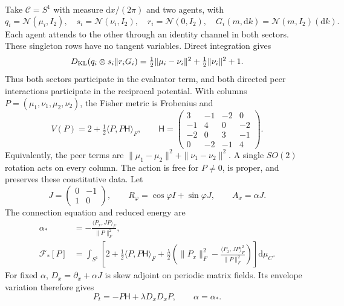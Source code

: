 Take $\mathcal C=S^1$ with measure $\mathrm d x/(2\pi)$ and two agents, with
\begin{equation}
 q_i=\mathcal N(\mu_i,I_2),\quad s_i=\mathcal N(\nu_i,I_2),\quad
 r_i=\mathcal N(0,I_2),\quad G_i(m,\mathrm d k)=\mathcal N(m,I_2)(\mathrm d k).
\end{equation}
Each agent attends to the other through an identity channel in both sectors. These singleton rows have no tangent variables. Direct integration gives
\begin{equation}
 D_{\mathrm{KL}}(q_i\otimes s_i\Vert r_iG_i)
 =\tfrac12\|\mu_i-\nu_i\|^2+\tfrac12\|\nu_i\|^2+1.
\end{equation}
Thus both sectors participate in the evaluator term, and both directed peer interactions participate in the reciprocal potential. With columns $P=(\mu_1,\nu_1,\mu_2,\nu_2)$, the Fisher metric is Frobenius and
\begin{equation}
 V(P)=2+\tfrac12\langle P,P\mathsf H\rangle_F,\qquad
 \mathsf H=\begin{pmatrix}
 3&-1&-2&0\\-1&4&0&-2\\-2&0&3&-1\\0&-2&-1&4
 \end{pmatrix}.
 \label{ctx:c:eq:witnessV}
\end{equation}
Equivalently, the peer terms are $\|\mu_1-\mu_2\|^2+\|\nu_1-\nu_2\|^2$. A single $SO(2)$ rotation acts on every column. The action is free for $P\ne0$, is proper, and preserves these constitutive data. Let
\begin{equation}
 J=\begin{pmatrix}0&-1\\1&0\end{pmatrix},\qquad
 R_\varphi=\cos\varphi I+\sin\varphi J,\qquad
 A_x=\alpha J.
\end{equation}
The connection equation and reduced energy are
\begin{align}
 \alpha_*&=-\frac{\langle P_x,JP\rangle_F}{\|P\|_F^2},\label{ctx:c:eq:alpha}\\
 \mathcal F_*[P]&=\int_{S^1}\left[
 2+\tfrac12\langle P,P\mathsf H\rangle_F+
 \frac\lambda2\left(\|P_x\|_F^2-
       \frac{\langle P_x,JP\rangle_F^2}{\|P\|_F^2}\right)\right]\mathrm d\mu_C.
\end{align}
For fixed $\alpha$, $D_x=\partial_x+\alpha J$ is skew adjoint on periodic matrix fields. Its envelope variation therefore gives
\begin{equation}
 \boxed{P_t=-P\mathsf H+\lambda D_xD_xP,\qquad \alpha=\alpha_*.}
 \label{ctx:c:eq:matrixflow}
\end{equation}

